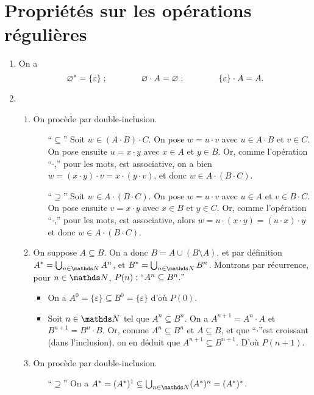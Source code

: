 \section{Propriétés sur les opérations régulières}

\begin{enumerate}
	\item On a \[
			\varnothing^* = \{\varepsilon\}\;;\qquad\qquad\varnothing\cdot A = \varnothing\;;\qquad\qquad \{\varepsilon\} \cdot A = A.
		\]
	\item
		\begin{enumerate}[label=\textit{(\arabic*)}]
			\item On procède par double-inclusion.
				\begin{itemize}
					\item[``$\subseteq$''] Soit $w \in (A \cdot B)\cdot C$. On pose $w = u \cdot v$\/ avec $u \in A\cdot B$\/ et $v \in C$. On pose ensuite $u = x \cdot y$\/ avec $x \in A$\/ et $y \in B$.
						Or, comme l'opération ``$\cdot$,'' pour les mots, est associative, on a bien $w = (x \cdot y) \cdot v = x \cdot (y \cdot v)$, et donc $w \in A \cdot (B \cdot C)$.
					\item[``$\supseteq$''] Soit $w \in A \cdot (B\cdot C)$. On pose $w = u \cdot v$\/ avec $u \in A$\/ et $v \in B \cdot C$. On pose ensuite $v = x\cdot y$\/ avec $x \in B$\/ et $y \in C$. Or, comme l'opération ``$\cdot$,'' pour les mots, est associative, alors $w = u \cdot (x\cdot y) = (u\cdot x) \cdot y$\/ et donc $w \in A\cdot (B\cdot C)$.
				\end{itemize}
			\item On suppose $A \subseteq B$.  On a donc $B = A \cup (B \setminus A)$, et par définition $A^* = \bigcup_{n \in \N}  A^n$, et $B^* = \bigcup_{n \in \N} B^n$. Montrons par récurrence, pour $n \in \N$, $P(n): ``A^n \subseteq B^n."$
				\begin{itemize}
					\item On a $A^0 = \{\varepsilon\} \subseteq B^0 = \{\varepsilon\}$\/ d'où $P(0)$.
					\item Soit $n \in \N$\/ tel que $A^n \subseteq B^n$. On a $A^{n+1} = A^n \cdot A$\/ et $B^{n+1} = B^n \cdot B$. Or, comme $A^n \subseteq B^n$\/ et $A \subseteq B$, et que ``$\cdot$''est croissant (dans l'inclusion), on en déduit que $A^{n+1} \subseteq B^{n+1}$. D'où $P(n+1)$.
				\end{itemize}
			\item On procède par double-inclusion.
				\begin{itemize}
					\item[``$\supseteq$''] On a $A^* = (A^*)^1 \subseteq \bigcup_{n \in \N} (A^*)^n = (A^*)^*$.

\end{itemize}
\end{enumerate}
\end{enumerate}
